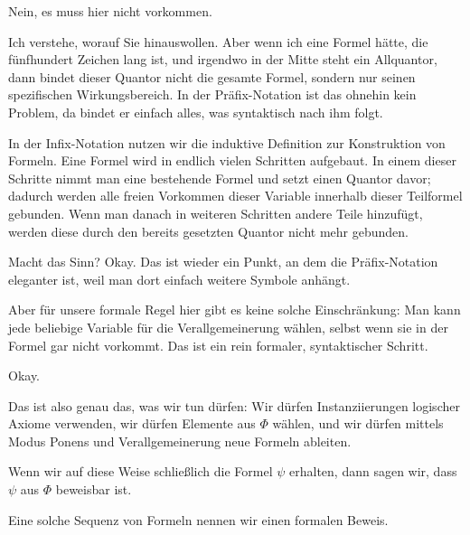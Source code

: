 \begin{spoken-clean}[00:24:30 - 00:26:20]

Nein, es muss hier nicht vorkommen. 


Ich verstehe, worauf Sie hinauswollen. Aber wenn ich eine Formel hätte, die fünfhundert Zeichen lang ist, und irgendwo in der Mitte steht ein Allquantor, dann bindet dieser Quantor nicht die gesamte Formel, sondern nur seinen spezifischen Wirkungsbereich. In der Präfix-Notation ist das ohnehin kein Problem, da bindet er einfach alles, was syntaktisch nach ihm folgt. 

In der Infix-Notation nutzen wir die induktive Definition zur Konstruktion von Formeln. Eine Formel wird in endlich vielen Schritten aufgebaut. In einem dieser Schritte nimmt man eine bestehende Formel und setzt einen Quantor davor; dadurch werden alle freien Vorkommen dieser Variable innerhalb dieser Teilformel gebunden. Wenn man danach in weiteren Schritten andere Teile hinzufügt, werden diese durch den bereits gesetzten Quantor nicht mehr gebunden. 

Macht das Sinn? Okay. Das ist wieder ein Punkt, an dem die Präfix-Notation eleganter ist, weil man dort einfach weitere Symbole anhängt. 

Aber für unsere formale Regel hier gibt es keine solche Einschränkung: Man kann jede beliebige Variable für die Verallgemeinerung wählen, selbst wenn sie in der Formel gar nicht vorkommt. Das ist ein rein formaler, syntaktischer Schritt. 

Okay.
\end{spoken-clean}

\begin{spoken-clean}[00:26:20 - 00:28:22]
Das ist also genau das, was wir tun dürfen: Wir dürfen Instanziierungen logischer Axiome verwenden, wir dürfen Elemente aus $\Phi$ wählen, und wir dürfen mittels Modus Ponens und Verallgemeinerung neue Formeln ableiten. 

Wenn wir auf diese Weise schließlich die Formel $\psi$ erhalten, dann sagen wir, dass $\psi$ aus $\Phi$ beweisbar ist. 

Eine solche Sequenz von Formeln nennen wir einen formalen Beweis. 

\end{spoken-clean}

